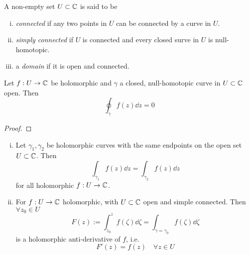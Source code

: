 \documentclass[../../script.tex]{subfiles}
\begin{document}
\begin{defi}
    A non-empty set $U \subset \mathbb{C}$ is said to be 
    \begin{enumerate}[(i)]
        \item \textit{connected} if any two points in $U$ can be connected by a curve in $U$.
        \item \textit{simply connected} if $U$ is connected and every closed surve in $U$ is null-homotopic.
        \item a \textit{domain} if it is open and connected.
    \end{enumerate}
\end{defi}

\begin{thm}
    Let $f: U \rightarrow \mathbb{C}$ be holomorphic and $\gamma$ a closed, null-homotopic curve in $U \subset \mathbb{C}$ open. Then 
    \[
        \oint_{\gamma} f(z) \dd{z} = 0
    \]
\end{thm}
\begin{proof}
    \noproof
\end{proof}

\begin{cor}
    \begin{enumerate}[(i)]
        \item Let $\gamma_1, \gamma_2$ be holomorphic curves with the same endpoints on the open set $U \subset \mathbb{C}$. Then 
        \[
            \int_{\gamma_1} f(z) \dd{z} = \int_{\gamma_2} f(z) \dd{z}
        \]
        for all holomorphic $f: U \rightarrow \mathbb{C}$.

        \item For $f: U \rightarrow \mathbb{C}$ holomorphic, with $U \subset \mathbb{C}$ open and simple connected. Then $\forall z_0 \in U$
        \[
            F(z) := \int_{z_0}^{z} f(\zeta) \dd{\zeta} = \int_{\gamma = \gamma_0} f(\zeta) \dd{\zeta}
        \]
        is a holomorphic anti-derivative of $f$, i.e. 
        \[
            F'(z) = f(z) \quad \forall z \in U
        \]
    \end{enumerate}
\end{cor}
\end{document}
